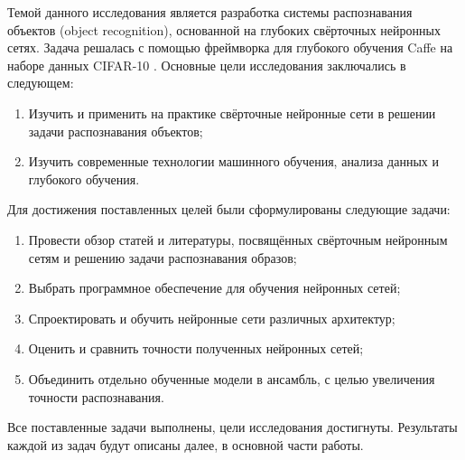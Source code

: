 Темой данного исследования является разработка системы распознавания объектов (object recognition), 
основанной на глубоких свёрточных нейронных сетях. Задача решалась с помощью  фреймворка для 
глубокого обучения Caffe \cite{jia2014caffe} на наборе данных CIFAR-10 \cite{learningmultiple}. 
Основные цели исследования заключались в следующем:
\begin{enumerate}
    \item Изучить и применить на практике свёрточные нейронные сети в решении задачи распознавания 
    объектов;
    \item Изучить современные технологии машинного обучения, анализа данных и глубокого  
    обучения.
\end{enumerate}
Для достижения поставленных целей были сформулированы следующие задачи:
\begin{enumerate}
    \item Провести обзор статей и литературы, посвящённых свёрточным нейронным сетям и решению 
    задачи распознавания образов;
    \item Выбрать программное обеспечение для обучения нейронных сетей;
    \item Спроектировать и обучить нейронные сети различных архитектур;
    \item Оценить и сравнить точности полученных нейронных сетей;
    \item Объединить отдельно обученные модели в ансамбль, с целью увеличения точности 
    распознавания.
\end{enumerate}
Все поставленные задачи выполнены, цели исследования достигнуты. Результаты каждой из задач будут 
описаны далее, в основной части работы.



